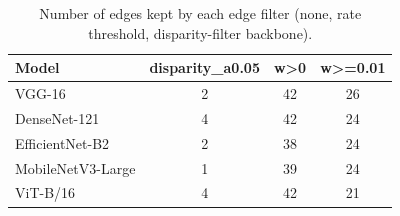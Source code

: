 \begin{table}[!tbp]
\centering
\caption{Number of edges kept by each edge filter (none, rate threshold, disparity-filter backbone).}
\label{tab:snafilters}
\footnotesize
\begin{tabular}{lccc}
\hline
Model & disparity\_a0.05 & w>0 & w>=0.01 \\
\hline
VGG-16 & 2 & 42 & 26 \\
DenseNet-121 & 4 & 42 & 24 \\
EfficientNet-B2 & 2 & 38 & 24 \\
MobileNetV3-Large & 1 & 39 & 24 \\
ViT-B/16 & 4 & 42 & 21 \\
\hline
\end{tabular}
\end{table}